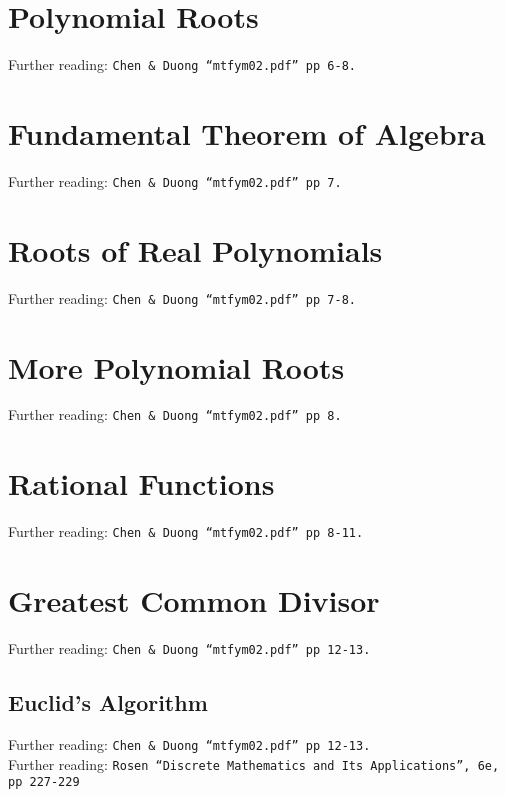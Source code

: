 \section{Polynomial Roots}
\label{sec:P Polynomial Root}
Further reading: \texttt{Chen \& Duong ``mtfym02.pdf'' pp 6-8.}

\section{Fundamental Theorem of Algebra}
\label{sec:P Fundamental Theorem of Algebra}
Further reading: \texttt{Chen \& Duong ``mtfym02.pdf'' pp 7.}

\section{Roots of Real Polynomials}
\label{sec:P Roots of Real Polynomial}
Further reading: \texttt{Chen \& Duong ``mtfym02.pdf'' pp 7-8.}

\section{More Polynomial Roots}
\label{sec:P More Polynomial Root}
Further reading: \texttt{Chen \& Duong ``mtfym02.pdf'' pp 8.}

\section{Rational Functions}
\label{sec:P Rational Functions}
Further reading: \texttt{Chen \& Duong ``mtfym02.pdf'' pp 8-11.}

\section{Greatest Common Divisor}
\label{sec:P Greatest Common Divisor}
Further reading: \texttt{Chen \& Duong ``mtfym02.pdf'' pp 12-13.}

\subsection{Euclid's Algorithm}
\label{sec:P Euclid's Algortihm}
Further reading: \texttt{Chen \& Duong ``mtfym02.pdf'' pp 12-13.}\\
Further reading: \texttt{Rosen ``Discrete Mathematics and Its Applications'', 6e, pp 227-229}